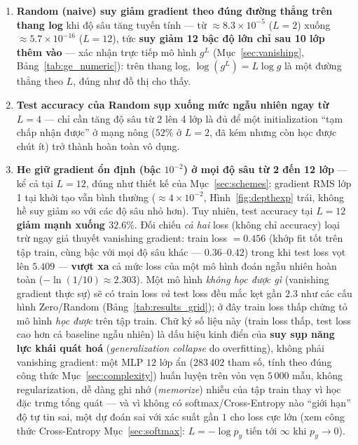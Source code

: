 \documentclass[12pt,a4paper]{report}
\newcommand{\en}[1]{\textit{#1}}
\begin{document}
\begin{enumerate}
\item \textbf{Random (naive) suy giảm gradient theo đúng đường thẳng trên
  thang log} khi độ sâu tăng tuyến tính --- từ $\approx8.3\times10^{-5}$
  ($L{=}2$) xuống $\approx5.7\times10^{-16}$ ($L{=}12$), tức
  \textbf{suy giảm 12 bậc độ lớn chỉ sau 10 lớp thêm vào} --- xác nhận
  trực tiếp mô hình $g^L$ (Mục~\ref{sec:vanishing}, Bảng~\ref{tab:ge_numeric}):
  trên thang log, $\log(g^L)=L\log g$ là một đường thẳng theo $L$, đúng
  như đồ thị cho thấy.
\item \textbf{Test accuracy của Random sụp xuống mức ngẫu nhiên ngay từ
  $L{=}4$} --- chỉ cần tăng độ sâu từ 2 lên 4 lớp là đủ để một
  initialization ``tạm chấp nhận được'' ở mạng nông ($52\%$ ở $L{=}2$, đã
  kém nhưng còn học được chút ít) trở thành hoàn toàn vô dụng.
\item \textbf{He giữ gradient ổn định (bậc $10^{-2}$) ở mọi độ sâu từ 2
  đến 12 lớp} --- kể cả tại $L{=}12$, đúng như thiết kế của
  Mục~\ref{sec:schemes}: gradient RMS lớp 1 tại khởi tạo vẫn bình thường
  ($\approx4\times10^{-2}$, Hình~\ref{fig:depthexp} trái, không hề suy
  giảm so với các độ sâu nhỏ hơn). Tuy nhiên, test accuracy tại $L{=}12$
  \textbf{giảm mạnh xuống $32.6\%$}. Đối chiếu \emph{cả hai} loss (không
  chỉ accuracy) loại trừ ngay giả thuyết vanishing gradient:
  train loss $=0.456$ (khớp fit tốt trên tập train, cùng bậc với mọi độ
  sâu khác --- $0.36$--$0.42$) trong khi test loss vọt lên
  $5.409$ --- \textbf{vượt xa} cả mức loss của một mô hình đoán ngẫu
  nhiên hoàn toàn ($-\ln(1/10)\approx2.303$). Một mô hình \emph{không
  học được gì} (vanishing gradient thực sự) sẽ có train loss \emph{và}
  test loss đều mắc kẹt gần $2.3$ như các cấu hình Zero/Random
  (Bảng~\ref{tab:results_grid}); ở đây train loss thấp chứng tỏ mô hình
  \emph{học được} trên tập train. Chữ ký số liệu này (train loss thấp,
  test loss cao hơn cả baseline ngẫu nhiên) là dấu hiệu kinh điển của
  \textbf{suy sụp năng lực khái quát hoá} (\en{generalization collapse}
  do overfitting), không phải vanishing gradient: một MLP $12$ lớp ẩn
  ($283\,402$ tham số, tính theo đúng công thức Mục~\ref{sec:complexity})
  huấn luyện trên vỏn vẹn $5\,000$ mẫu, không regularization, dễ dàng ghi
  nhớ (\en{memorize}) nhiễu của tập train thay vì học đặc trưng tổng
  quát --- và vì không có softmax/Cross-Entropy nào ``giới hạn'' độ tự
  tin sai, một dự đoán sai với xác suất gần $1$ cho loss cực lớn (xem
  công thức Cross-Entropy Mục~\ref{sec:softmax}: $L=-\log p_{y}$ tiến tới
  $\infty$ khi $p_y\to0$).
\end{enumerate}
\end{document}
